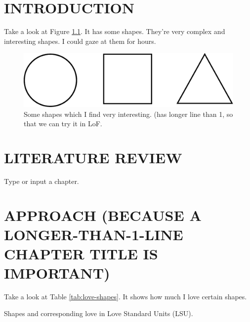 \documentclass[dissertation]{uathesis}
\author{Joe Somebody}       %
\title{Title of the thesis: the top line should be the longest \and
  the middle one is second longest \and
  and the last is shortest}
\begin{document}
\makefrontmatter


\begin{body}

\chapter{INTRODUCTION}

Take a look at Figure \ref{fig:shapes}. It has some shapes. They're very
complex and interesting shapes. I could gaze at them for hours.

\begin{figure}
  \centering
  \includegraphics[width=5.0in]{fig/shapes.pdf}
  \caption{Some shapes which I find very interesting. (has longer line than 1, so that we can try it in LoF.}
  \label{fig:shapes}
\end{figure}

\chapter{LITERATURE REVIEW}
Type or input{} a chapter. \cite{rocket-themoon2167}

\chapter{APPROACH (BECAUSE A LONGER-THAN-1-LINE CHAPTER TITLE IS IMPORTANT)}
Take a look at Table \ref{tab:love-shapes}. It shows how much I love certain
shapes.

\begin{table}
  \centering
  
  \caption{Shapes and corresponding love in Love Standard Units (LSU).}
  \label{tab:love-shapes}
\end{table}


\end{body}
\end{document}
